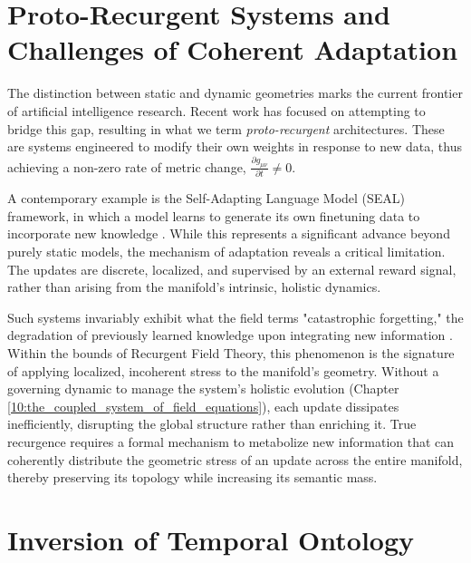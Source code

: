 
\section{Proto-Recurgent Systems and Challenges of Coherent Adaptation}
\label{9.4:proto_recurgent_systems_and_challenges_of_coherent_adaptation}

The distinction between static and dynamic geometries marks the current frontier of artificial intelligence research. Recent work has focused on attempting to bridge this gap, resulting in what we term \textit{proto-recurgent} architectures. These are systems engineered to modify their own weights in response to new data, thus achieving a non-zero rate of metric change, \(\frac{\partial g_{\mu\nu}}{\partial t} \neq 0\).

A contemporary example is the Self-Adapting Language Model (SEAL) framework, in which a model learns to generate its own finetuning data to incorporate new knowledge \autocite{zweiger2025seal}. While this represents a significant advance beyond purely static models, the mechanism of adaptation reveals a critical limitation. The updates are discrete, localized, and supervised by an external reward signal, rather than arising from the manifold's intrinsic, holistic dynamics.

Such systems invariably exhibit what the field terms "catastrophic forgetting," the degradation of previously learned knowledge upon integrating new information \autocite{McCloskeyCohen1989, French1999}. Within the bounds of Recurgent Field Theory, this phenomenon is the signature of applying localized, incoherent stress to the manifold's geometry. Without a governing dynamic to manage the system's holistic evolution (Chapter \ref{10:the_coupled_system_of_field_equations}), each update dissipates inefficiently, disrupting the global structure rather than enriching it. True recurgence requires a formal mechanism to metabolize new information that can coherently distribute the geometric stress of an update across the entire manifold, thereby preserving its topology while increasing its semantic mass.


\section{Inversion of Temporal Ontology}
\label{9.5:inversion_of_temporal_ontology}

